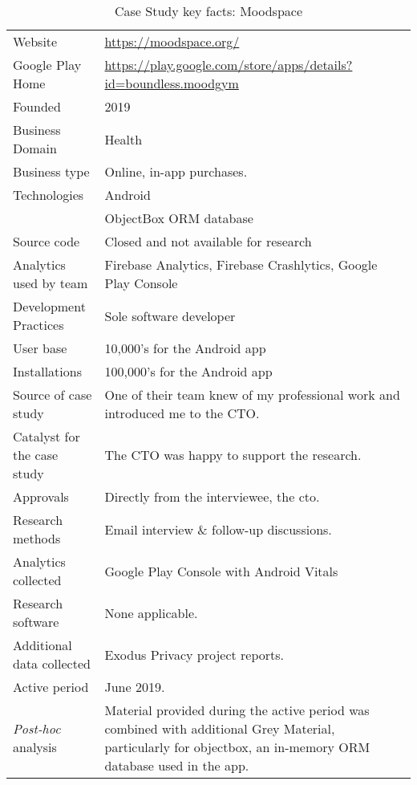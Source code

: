 {\renewcommand{\arraystretch}{0.8}%
\begin{table*}
    \centering
    \small
    \setlength{\tabcolsep}{6pt}
    \begin{tabular}{lp{9cm}}
       \toprule
       Website &\url{https://moodspace.org/} \\
       Google Play Home & \url{https://play.google.com/store/apps/details?id=boundless.moodgym} \\
       Founded & 2019 \\
       Business Domain & Health \\
       Business type & Online, in-app purchases. \\
       Technologies  & Android \\
       & ObjectBox ORM database \\
       Source code  &Closed and not available for research \\
       Analytics used by team & Firebase Analytics, Firebase Crashlytics, Google Play Console \\
       Development Practices & Sole software developer \\
       \midrule
       User base & 10,000's for the Android app \\
       Installations & 100,000's for the Android app \\
       \midrule
       Source of case study &One of their team knew of my professional work and introduced me to the CTO. \\
       Catalyst for the case study &The CTO was happy to support the research. \\
       Approvals &Directly from the interviewee, the \Gls{cto}. \\
       \midrule
       Research methods &Email interview \& follow-up discussions. \\
       Analytics collected &Google Play Console with Android Vitals \\
       Research software & None applicable. \\
       Additional data collected &Exodus Privacy project reports. \\
       Active period & June 2019. \\
       \midrule
       \emph{Post-hoc} analysis &Material provided during the active period was combined with additional Grey Material, particularly for objectbox, an in-memory ORM database used in the app. \\
       \bottomrule
    \end{tabular}
    \caption{Case Study key facts: Moodspace}
    \label{tab:moodspace_case_study_anaytics_overview}
\end{table*}
}

